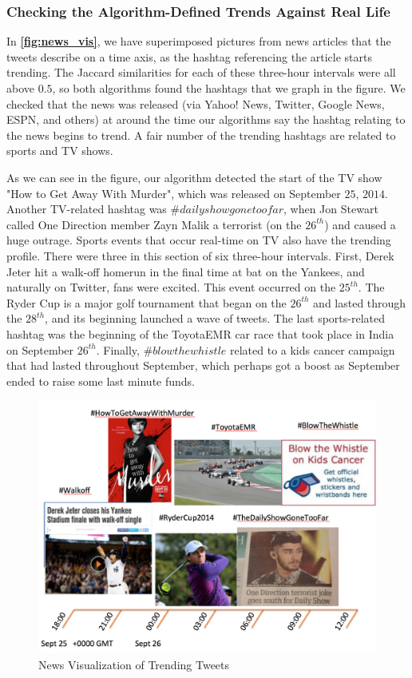 \documentclass[twoside]{article}
\newcommand{\aref}[1]
 {\textbf{\autoref{#1}}}
\begin{document}
{\subsubsection{Checking the Algorithm-Defined Trends Against Real Life}

In \aref{fig:news_vis}, we have superimposed pictures from 
news articles that the tweets describe on a time axis, as
the hashtag referencing the article starts trending. The Jaccard similarities 
for each of these three-hour intervals were all above $0.5$, so both algorithms
found the hashtags that we graph in the figure.
We checked that the news was released (via Yahoo! News, Twitter, Google News, ESPN, and others)
at around the time our algorithms say the hashtag relating to the news
begins to trend. A fair number of the trending hashtags are related to sports and TV shows. 

As we can see in the figure, our algorithm detected the start of the TV show "How to Get Away With Murder", which was released on September $25$, $2014$. Another TV-related hashtag was $\#dailyshowgonetoofar$, when Jon Stewart called One Direction member Zayn Malik a terrorist (on the $26^{th}$) and caused a huge outrage. Sports events that occur real-time on TV also have the trending profile. There were three in this section of six three-hour intervals. First, Derek Jeter hit a walk-off homerun in the final time at bat on the Yankees, and naturally on Twitter, fans were excited. This event occurred on the $25^{th}$. The Ryder Cup is a major golf tournament that began on the $26^{th}$ and lasted through the $28^{th}$, and its beginning launched a wave of tweets. The last sports-related hashtag was the beginning of the ToyotaEMR car race that took place in India on September $26^{th}$. Finally, $\#blowthewhistle$ related to a kids cancer campaign that had lasted throughout September, which perhaps got a boost as September ended to raise some last minute funds.

\begin{figure} 
\centering
\includegraphics[scale = .4]{Timeline}
\caption{News Visualization of Trending Tweets}
\label{fig:news_vis}
\end{figure}



}
\end{document}
